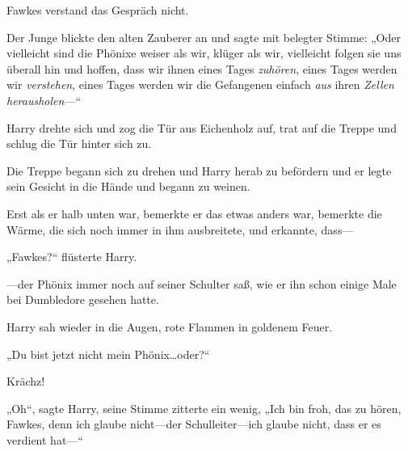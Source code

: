 Fawkes verstand das Gespräch nicht.

Der Junge blickte den alten Zauberer an und sagte mit belegter Stimme: „Oder vielleicht sind die Phönixe weiser als wir, klüger als wir, vielleicht folgen sie uns überall hin und hoffen, dass wir ihnen eines Tages \emph{zuhören}, eines Tages werden wir \emph{verstehen}, eines Tages werden wir die Gefangenen einfach \emph{aus} ihren \emph{Zellen} \emph{herausholen}—“

Harry drehte sich und zog die Tür aus Eichenholz auf, trat auf die Treppe und schlug die Tür hinter sich zu.

Die Treppe begann sich zu drehen und Harry herab zu befördern und er legte sein Gesicht in die Hände und begann zu weinen.

Erst als er halb unten war, bemerkte er das etwas anders war, bemerkte die Wärme, die sich noch immer in ihm ausbreitete, und erkannte, dass—

„Fawkes?“ flüsterte Harry.

—der Phönix immer noch auf seiner Schulter saß, wie er ihn schon einige Male bei Dumbledore gesehen hatte.

Harry sah wieder in die Augen, rote Flammen in goldenem Feuer.

„Du bist jetzt nicht mein Phönix…oder?“

Krächz!

„Oh“, sagte Harry, seine Stimme zitterte ein wenig, „Ich bin froh, das zu hören, Fawkes, denn ich glaube nicht—der Schulleiter—ich glaube nicht, dass er es verdient hat—“

